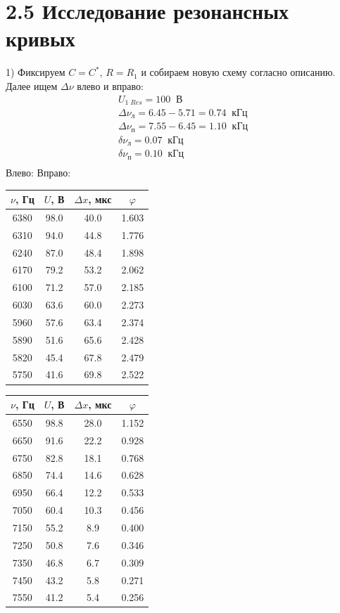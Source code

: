 \documentclass[a4paper,12pt]{extarticle}
\begin{document}
\section*{2.5 Исследование резонансных кривых}
1) Фиксируем  $C = C^*$, $R = R_1$ и собираем новую схему согласно описанию. Далее ищем $\Delta \nu$ влево и вправо: 
\begin{multline*}
    U_{1\;Res} = 100\;\;\text{В} \\
    \Delta \nu_{\text{л}} = 6.45 - 5.71 = 0.74\;\;\text{кГц} \\
    \Delta \nu_{\text{п}} = 7.55 - 6.45 = 1.10\;\;\text{кГц}\\
    \delta \nu_{\text{л}} = 0.07\;\;\text{кГц}\\
    \delta \nu_{\text{п}} = 0.10\;\;\text{кГц}\\
\end{multline*}
Влево: \hspace{46.5 mm} Вправо:\\
\begin{tabular}{|c|c|c|c|}
\hline
$\nu$, Гц   & $U$, В    & $\Delta x$, мкс & $\varphi$    \\ \hline
6380 & 98.0 & 40.0 & 1.603 \\ \hline
6310 & 94.0 & 44.8 & 1.776 \\ \hline
6240 & 87.0 & 48.4 & 1.898 \\ \hline
6170 & 79.2 & 53.2 & 2.062 \\ \hline
6100 & 71.2 & 57.0 & 2.185 \\ \hline
6030 & 63.6 & 60.0 & 2.273 \\ \hline
5960 & 57.6 & 63.4 & 2.374 \\ \hline
5890 & 51.6 & 65.6 & 2.428 \\ \hline
5820 & 45.4 & 67.8 & 2.479 \\ \hline
5750 & 41.6 & 69.8 & 2.522 \\ \hline
\end{tabular}
\begin{tabular}{|c|c|c|c|}
\hline
$\nu$, Гц   & $U$, В    & $\Delta x$, мкс & $\varphi$    \\ \hline
6550 & 98.8 & 28.0 & 1.152 \\ \hline
6650 & 91.6 & 22.2 & 0.928 \\ \hline
6750 & 82.8 & 18.1 & 0.768 \\ \hline
6850 & 74.4 & 14.6 & 0.628 \\ \hline
6950 & 66.4 & 12.2 & 0.533 \\ \hline
7050 & 60.4 & 10.3 & 0.456 \\ \hline
7150 & 55.2 & 8.9  & 0.400 \\ \hline
7250 & 50.8 & 7.6  & 0.346 \\ \hline
7350 & 46.8 & 6.7  & 0.309 \\ \hline
7450 & 43.2 & 5.8  & 0.271 \\ \hline
7550 & 41.2 & 5.4  & 0.256 \\ \hline
\end{tabular}\\
\end{document}
